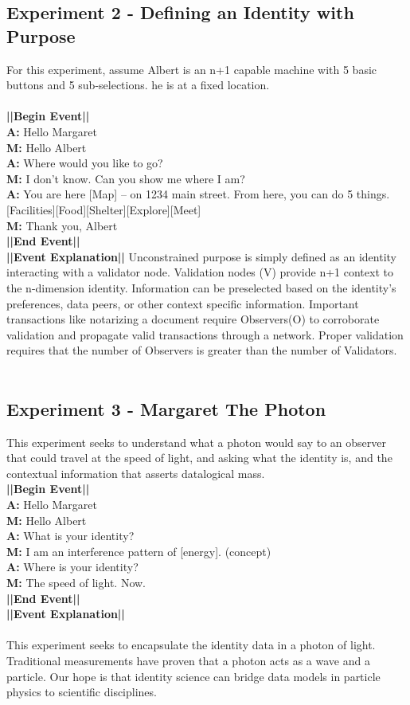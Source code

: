 \documentclass{article}
\begin{document}
\subsection{Experiment 2 - Defining an Identity with Purpose}
For this experiment, assume Albert is an n+1 capable machine with 5 basic buttons and 5 sub-selections.  he is at a fixed location. \\\\
\textbf{||Begin Event||} \\
\textbf{A:} Hello Margaret\\ 
\textbf{M:} Hello Albert \\
\textbf{A:} Where would you like to go? \\ 
\textbf{M:} I don’t know.  Can you show me where I am? \\ 
\textbf{A:} You are here [Map] – on 1234 main street.  From here, you can do 5 things. [Facilities][Food][Shelter][Explore][Meet] \\
\textbf{M:} Thank you, Albert \\
\textbf{||End Event||} \\
\textbf{||Event Explanation||} Unconstrained purpose is simply defined as an identity interacting with a validator node.  Validation nodes (V) provide n+1 context to the n-dimension identity.  Information can be preselected based on the identity’s preferences, data peers, or other context specific information.  Important transactions like notarizing a document require Observers(O) to corroborate validation and propagate valid transactions through a network.  Proper validation requires that the number of Observers is greater than the number of Validators. \\\\

\subsection{Experiment 3 - Margaret The Photon}
This experiment seeks to understand what a photon would say to an observer that could travel at the speed of light, and asking what the identity is, and the contextual information that asserts datalogical mass. \\
\textbf{||Begin Event||} \\
\textbf{A:} Hello Margaret \\
\textbf{M:} Hello Albert \\
\textbf{A:} What is your identity? \\
\textbf{M:} I am an interference pattern of [energy]. (concept) \\
\textbf{A:} Where is your identity? \\
\textbf{M:} The speed of light. Now. \\
\textbf{||End Event||} \\
\textbf{||Event Explanation||}\\\\
This experiment seeks to encapsulate the identity data in a photon of light.  Traditional measurements have proven that a photon acts as a wave and a particle.  Our hope is that identity science can bridge data models in particle physics to scientific disciplines.
\end{document}
